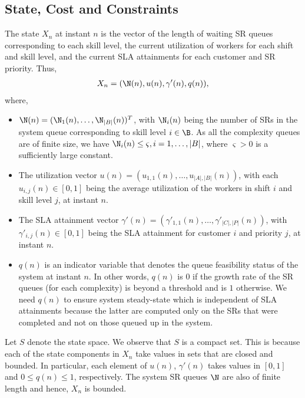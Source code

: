 \documentclass[11pt,letterpaper,english]{article}
\begin{document}
\subsection{State, Cost and Constraints}
\label{sect:scc}
The state $X_n$ at instant $n$ is the vector of the length of waiting SR
queues corresponding to each skill level, the current  utilization of workers
for each shift and skill level, and the current SLA attainments for each
customer and SR priority. Thus,
\begin{align}
X_{n}  = ( \N(n), u(n), \gamma'(n), q(n)),
\end{align}
where,
\begin{itemize}[$\bullet$]
\item $\N(n) = (\N_1(n), \ldots, \N_{|B|}(n))^T$, with  $\N_i(n)$ being the number of SRs in 
the system queue corresponding to skill level $i \in \B$. As all the complexity queues are of 
finite size, we have $\N_i(n) \le \varsigma , i=1,\ldots,|B|$, where $\varsigma >0$ 
is a sufficiently large constant.
    \item The utilization vector $u(n) = (u_{1,1}(n),\ldots,u_{|A|,|B|}(n))$,
with each  $u_{i,j}(n) \in [0,1]$ being the average utilization of the workers in
shift $i$ and skill level $j$, at instant $n$.
    \item The SLA attainment vector $\gamma'(n) = (\gamma'_{1,1}(n),\ldots,\gamma'_{|C|,|P|}(n))$, 
with $\gamma'_{i,j}(n) \in [0,1]$ being the SLA attainment for customer $i$ and priority $j$, at instant $n$.
    \item $q(n)$ is an indicator variable that denotes the queue feasibility status of the system at instant $n$. In other words,  $q(n)$ is $0$ if the growth rate of the SR queues (for each complexity) is beyond a threshold and is $1$ otherwise. We need $q(n)$ to ensure system steady-state which is independent of SLA attainments because the latter are computed only
on the SRs that were completed and not on those queued up in the system.
\end{itemize}
Let $S$ denote the state space. We observe that $S$ is a compact set. This is
because each of the state components in $X_n$ take values in sets that are closed and bounded. In
particular, each element of $u(n)$, $\gamma'(n)$ takes values in $[0,1]$ and $0
\le q(n) \le 1$, respectively. The system SR queues $\N$ are also of finite length and hence,
$X_n$ is bounded. 
\end{document}
